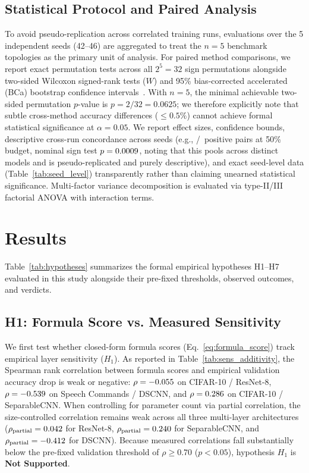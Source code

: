 \documentclass{ieeeaccess}
\begin{document}
\subsection{Statistical Protocol and Paired Analysis}
To avoid pseudo-replication across correlated training runs, evaluations over the 5 independent seeds (42--46) are aggregated to treat the $n = 5$ benchmark topologies as the primary unit of analysis. For paired method comparisons, we report exact permutation tests across all $2^5 = 32$ sign permutations alongside two-sided Wilcoxon signed-rank tests ($W$) and 95\% bias-corrected accelerated (BCa) bootstrap confidence intervals~\cite{efron1987better}. With $n = 5$, the minimal achievable two-sided permutation $p$-value is $p = 2/32 = 0.0625$; we therefore explicitly note that subtle cross-method accuracy differences ($\le 0.5\%$) cannot achieve formal statistical significance at $\alpha = 0.05$. We report effect sizes, confidence bounds, descriptive cross-run concordance across seeds (e.g., \MacroSeedLevelPositiveFiftyCount/\MacroSeedLevelPositiveFiftyTotal\ positive pairs at 50\% budget, nominal sign test $p = 0.0009$, noting that this pools across distinct models and is pseudo-replicated and purely descriptive), and exact seed-level data (Table~\ref{tab:seed_level}) transparently rather than claiming unearned statistical significance. Multi-factor variance decomposition is evaluated via type-II/III factorial ANOVA with interaction terms.

\section{Results}
\label{sec:results}

Table~\ref{tab:hypotheses} summarizes the formal empirical hypotheses H1--H7 evaluated in this study alongside their pre-fixed thresholds, observed outcomes, and verdicts.


\subsection{H1: Formula Score vs. Measured Sensitivity}
We first test whether closed-form formula scores (Eq.~\ref{eq:formula_score}) track empirical layer sensitivity ($H_1$). As reported in Table~\ref{tab:sens_additivity}, the Spearman rank correlation between formula scores and empirical validation accuracy drop is weak or negative: $\rho = -0.055$ on CIFAR-10 / ResNet-8, $\rho = -0.539$ on Speech Commands / DSCNN, and $\rho = 0.286$ on CIFAR-10 / SeparableCNN. When controlling for parameter count via partial correlation, the size-controlled correlation remains weak across all three multi-layer architectures ($\rho_{\text{partial}} = 0.042$ for ResNet-8, $\rho_{\text{partial}} = 0.240$ for SeparableCNN, and $\rho_{\text{partial}} = -0.412$ for DSCNN). Because measured correlations fall substantially below the pre-fixed validation threshold of $\rho \ge 0.70$ ($p < 0.05$), hypothesis $H_1$ is \textbf{Not Supported}.
\end{document}
